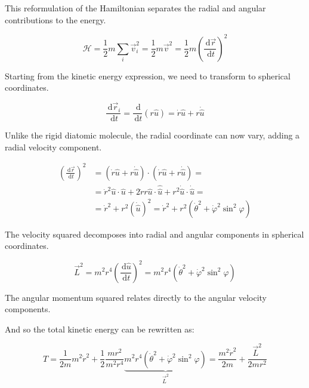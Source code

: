 This reformulation of the Hamiltonian separates the radial and angular contributions to the energy.

\begin{equation}
\mathcal{H}=\frac{1}{2} m \sum_{i} \vec{v}_{i}^{2}=\frac{1}{2} m \vec{v}^{2}=\frac{1}{2} m\left(\frac{\, \mathrm{d} \vec{r}}{\, \mathrm{d} t}\right)^{2}
\end{equation}

Starting from the kinetic energy expression, we need to transform to spherical coordinates.

\begin{equation}
\frac{\, \mathrm{d} \vec{r}_{i}}{\, \mathrm{d} t}=\frac{\, \mathrm{d}}{\, \mathrm{d} t}(r \hat{u})=\dot{r} \hat{u}+r \dot{\hat{u}}
\end{equation}

Unlike the rigid diatomic molecule, the radial coordinate can now vary, adding a radial velocity component.

\begin{align}
\left(\frac{\, \mathrm{d} \vec{r}}{\, \mathrm{d} t}\right)^{2} & =(\dot{r} \hat{u}+r \dot{\hat{u}}) \cdot(\dot{r} \hat{u}+r \dot{\hat{u}})= \\
& =\dot{r}^{2} \hat{u} \cdot \hat{u}+2 \dot{r} r \hat{u} \cdot \hat{\hat{u}}+r^{2} \dot{\hat{u}} \cdot \dot{\hat{u}}=  \\
& =\dot{r}^{2}+r^{2}(\dot{\hat{u}})^{2}=\dot{r}^{2}+r^{2}\left(\dot{\theta}^{2}+\dot{\varphi}^{2} \sin ^{2} \varphi\right)
\end{align}

The velocity squared decomposes into radial and angular components in spherical coordinates.

\begin{equation}
\vec{L}^{2}=m^{2} r^{4}\left(\frac{\, \mathrm{d} \hat{u}}{\, \mathrm{d} t}\right)^{2}=m^{2} r^{4}\left(\dot{\theta}^{2}+\dot{\varphi}^{2} \sin ^{2} \varphi\right)
\end{equation}

The angular momentum squared relates directly to the angular velocity components.

And so the total kinetic energy can be rewritten as:

\begin{equation}
T=\frac{1}{2 m} m^{2} \dot{r}^{2}+\frac{1}{2} \frac{m r^{2}}{m^{2} r^{4}} \underbrace{m^{2} r^{4}\left(\dot{\theta}^{2}+\dot{\varphi}^{2} \sin ^{2} \varphi\right)}_{\vec{L}^{2}}=\frac{m^{2} \dot{r}^{2}}{2 m}+\frac{\vec{L}^{2}}{2 m r^{2}}
\end{equation}

